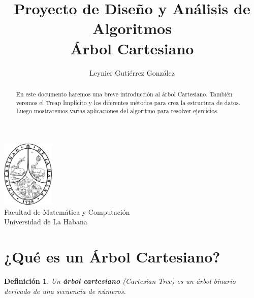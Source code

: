 \documentclass[12pt]{article}
\title{Proyecto de Diseño y Análisis de Algoritmos\\ \vspace{.2cm} \textbf{Árbol Cartesiano}}
\author{Leynier Gutiérrez González}
\newcommand{\nl}{\vspace{0.3cm}}
\newcommand{\ct}{árbol cartesiano }
\newtheorem{definition}{Definición}
\begin{document}
\maketitle

\vspace{0.5cm}

\begin{center}
	\vspace{0.2cm}
	\includegraphics[width=2.5cm]{images/escudo.png}\\
	\vspace{0.2cm}
	Facultad de Matemática y Computación\\
	\vspace{0.1cm}
	Universidad de La Habana\\
	\vspace{1cm}
\end{center}

\vspace{1cm}

\begin{abstract}
	En este documento haremos una breve introducción al árbol Cartesiano. También veremos el Treap Implícito y los diferentes métodos para crea la estructura de datos. Luego mostraremos varias aplicaciones del algoritmo para resolver ejercicios.
\end{abstract}

\newpage

\tableofcontents

\newpage

\section{¿Qué es un Árbol Cartesiano?}

\nl

\begin{definition}
	Un \textbf{\ct}(Cartesian Tree) es un árbol binario derivado de una secuencia de números.
\end{definition}
\end{document}
